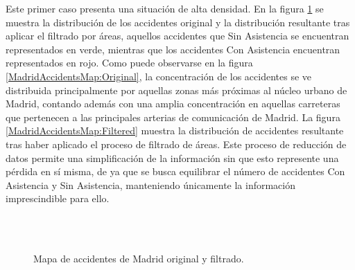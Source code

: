 \documentclass{uathesis-es}
\begin{document}
{		Este primer caso presenta una situación de alta densidad. En la figura \ref{MadridAccidentsMap} se muestra la distribución de los accidentes original y la distribución resultante tras aplicar el filtrado por áreas, aquellos accidentes que Sin Asistencia se encuentran representados en verde, mientras que los accidentes Con Asistencia encuentran representados en rojo. Como puede observarse en la figura \ref{MadridAccidentsMap:Original}, la concentración de los accidentes se ve distribuida principalmente por aquellas zonas más próximas al núcleo urbano de Madrid, contando además con una amplia concentración en aquellas carreteras que pertenecen a las principales arterias de comunicación de Madrid. La figura  \ref{MadridAccidentsMap:Filtered} muestra la distribución de accidentes resultante tras haber aplicado el proceso de filtrado de áreas. Este proceso de reducción de datos permite una simplificación de la información sin que esto represente una pérdida en sí misma, de ya que se busca equilibrar el número de accidentes Con Asistencia y Sin Asistencia, manteniendo únicamente la información imprescindible para ello.
		
		\begin{figure}[H]
			\centering
			\\
			\\
			\caption{Mapa de accidentes de Madrid original y filtrado.}
			\label{MadridAccidentsMap}
		\end{figure}
		
}
\end{document}
